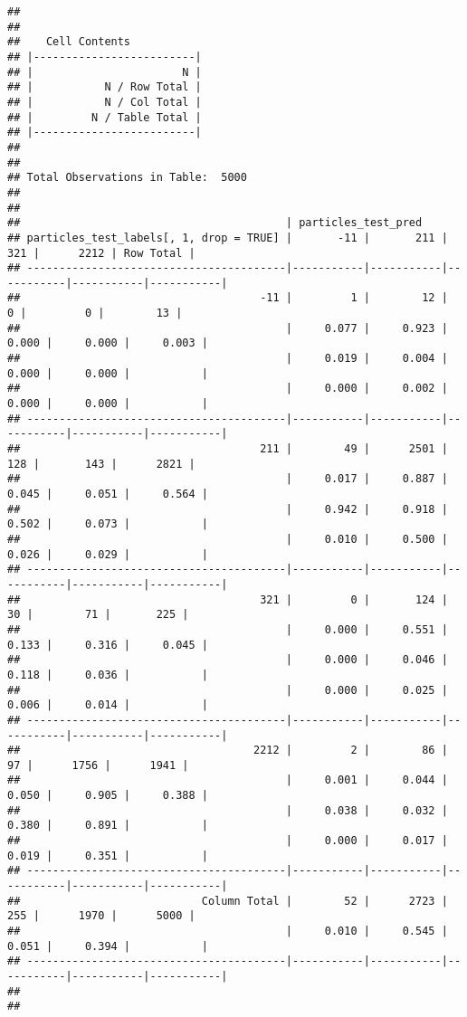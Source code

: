 \documentclass[
]{article}
\begin{document}
\begin{verbatim}
## 
##  
##    Cell Contents
## |-------------------------|
## |                       N |
## |           N / Row Total |
## |           N / Col Total |
## |         N / Table Total |
## |-------------------------|
## 
##  
## Total Observations in Table:  5000 
## 
##  
##                                         | particles_test_pred 
## particles_test_labels[, 1, drop = TRUE] |       -11 |       211 |       321 |      2212 | Row Total | 
## ----------------------------------------|-----------|-----------|-----------|-----------|-----------|
##                                     -11 |         1 |        12 |         0 |         0 |        13 | 
##                                         |     0.077 |     0.923 |     0.000 |     0.000 |     0.003 | 
##                                         |     0.019 |     0.004 |     0.000 |     0.000 |           | 
##                                         |     0.000 |     0.002 |     0.000 |     0.000 |           | 
## ----------------------------------------|-----------|-----------|-----------|-----------|-----------|
##                                     211 |        49 |      2501 |       128 |       143 |      2821 | 
##                                         |     0.017 |     0.887 |     0.045 |     0.051 |     0.564 | 
##                                         |     0.942 |     0.918 |     0.502 |     0.073 |           | 
##                                         |     0.010 |     0.500 |     0.026 |     0.029 |           | 
## ----------------------------------------|-----------|-----------|-----------|-----------|-----------|
##                                     321 |         0 |       124 |        30 |        71 |       225 | 
##                                         |     0.000 |     0.551 |     0.133 |     0.316 |     0.045 | 
##                                         |     0.000 |     0.046 |     0.118 |     0.036 |           | 
##                                         |     0.000 |     0.025 |     0.006 |     0.014 |           | 
## ----------------------------------------|-----------|-----------|-----------|-----------|-----------|
##                                    2212 |         2 |        86 |        97 |      1756 |      1941 | 
##                                         |     0.001 |     0.044 |     0.050 |     0.905 |     0.388 | 
##                                         |     0.038 |     0.032 |     0.380 |     0.891 |           | 
##                                         |     0.000 |     0.017 |     0.019 |     0.351 |           | 
## ----------------------------------------|-----------|-----------|-----------|-----------|-----------|
##                            Column Total |        52 |      2723 |       255 |      1970 |      5000 | 
##                                         |     0.010 |     0.545 |     0.051 |     0.394 |           | 
## ----------------------------------------|-----------|-----------|-----------|-----------|-----------|
## 
## 
\end{verbatim}
\end{document}

